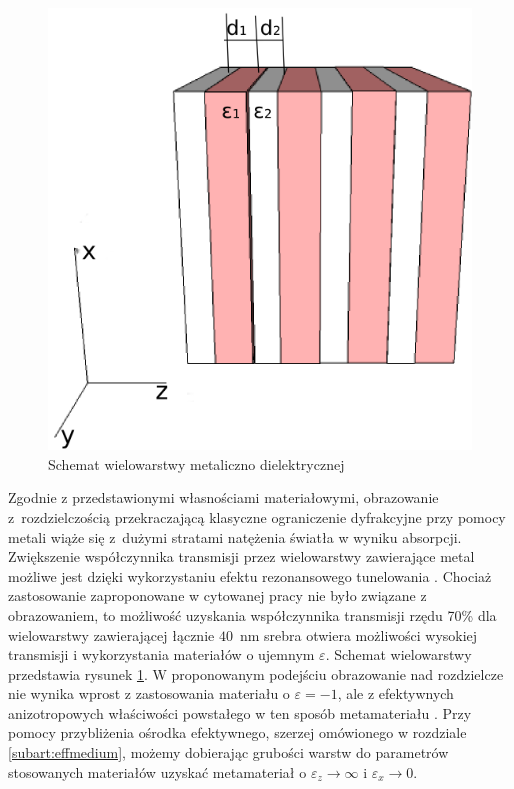 \begin{figure}[tbh]
	\centering
	\includegraphics[width=.5\textwidth]{images/multilayer/multilayer-3d.png}
	\caption{Schemat wielowarstwy metaliczno dielektrycznej}
	\label{fig:mulschem}
\end{figure}


Zgodnie z przedstawionymi własnościami materiałowymi, obrazowanie z~rozdzielczością przekraczającą klasyczne ograniczenie dyfrakcyjne przy pomocy metali wiąże się z~dużymi stratami natężenia światła w wyniku absorpcji. Zwiększenie współczynnika transmisji przez wielowarstwy zawierające metal możliwe jest dzięki wykorzystaniu efektu rezonansowego tunelowania \cite{scalora-transparentmetal}. Chociaż zastosowanie zaproponowane w cytowanej pracy nie było związane z obrazowaniem, to możliwość uzyskania współczynnika transmisji rzędu 70\% dla wielowarstwy zawierającej łącznie $40$~nm srebra otwiera możliwości wysokiej transmisji i wykorzystania materiałów o ujemnym $\varepsilon$. Schemat wielowarstwy przedstawia rysunek \ref{fig:mulschem}. W proponowanym podejściu obrazowanie nad rozdzielcze nie wynika wprost z zastosowania materiału o $\varepsilon = -1$, ale z efektywnych anizotropowych właściwości powstałego w ten sposób  metamateriału \cite{ramakrishna2003imaging}. Przy pomocy przybliżenia ośrodka efektywnego, szerzej omówionego w rozdziale \ref{subart:effmedium}, możemy dobierając grubości warstw do parametrów stosowanych materiałów uzyskać metamateriał o $\varepsilon_z \to \infty$ i $\varepsilon_x \to 0$.



